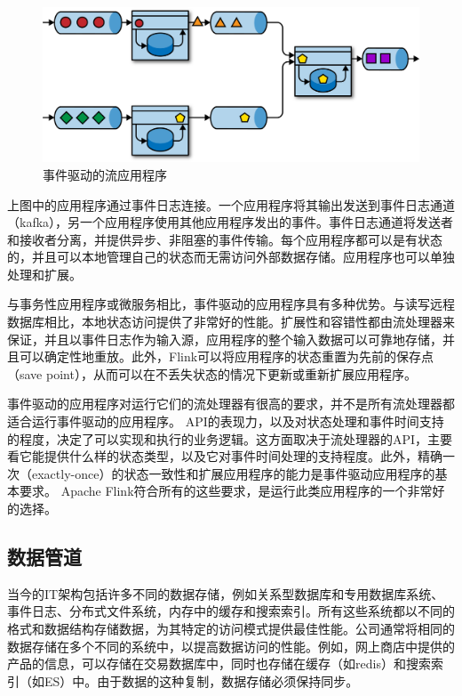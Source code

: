 \documentclass[cn,11pt,chinese]{elegantbook}
\begin{document}
\begin{figure}
\centering
\includegraphics{images/spaf_0105.png}
\caption{事件驱动的流应用程序}
\end{figure}

上图中的应用程序通过事件日志连接。一个应用程序将其输出发送到事件日志通道（kafka），另一个应用程序使用其他应用程序发出的事件。事件日志通道将发送者和接收者分离，并提供异步、非阻塞的事件传输。每个应用程序都可以是有状态的，并且可以本地管理自己的状态而无需访问外部数据存储。应用程序也可以单独处理和扩展。

与事务性应用程序或微服务相比，事件驱动的应用程序具有多种优势。与读写远程数据库相比，本地状态访问提供了非常好的性能。扩展性和容错性都由流处理器来保证，并且以事件日志作为输入源，应用程序的整个输入数据可以可靠地存储，并且可以确定性地重放。此外，Flink可以将应用程序的状态重置为先前的保存点（save
point），从而可以在不丢失状态的情况下更新或重新扩展应用程序。

事件驱动的应用程序对运行它们的流处理器有很高的要求，并不是所有流处理器都适合运行事件驱动的应用程序。
API的表现力，以及对状态处理和事件时间支持的程度，决定了可以实现和执行的业务逻辑。这方面取决于流处理器的API，主要看它能提供什么样的状态类型，以及它对事件时间处理的支持程度。此外，精确一次（exactly-once）的状态一致性和扩展应用程序的能力是事件驱动应用程序的基本要求。
Apache Flink符合所有的这些要求，是运行此类应用程序的一个非常好的选择。

\hypertarget{ux6570ux636eux7ba1ux9053}{%
\subsection{数据管道}\label{ux6570ux636eux7ba1ux9053}}

当今的IT架构包括许多不同的数据存储，例如关系型数据库和专用数据库系统、事件日志、分布式文件系统，内存中的缓存和搜索索引。所有这些系统都以不同的格式和数据结构存储数据，为其特定的访问模式提供最佳性能。公司通常将相同的数据存储在多个不同的系统中，以提高数据访问的性能。例如，网上商店中提供的产品的信息，可以存储在交易数据库中，同时也存储在缓存（如redis）和搜索索引（如ES）中。由于数据的这种复制，数据存储必须保持同步。
\end{document}
